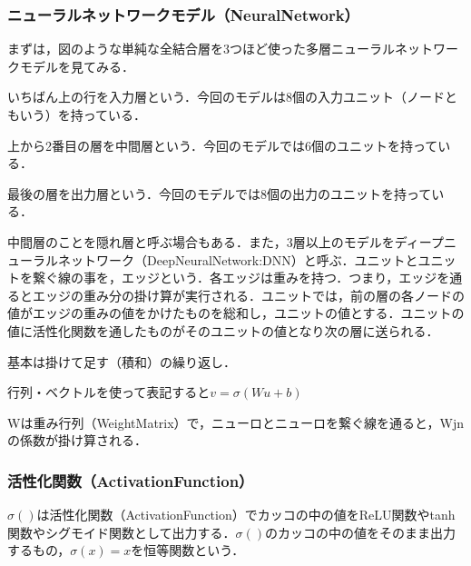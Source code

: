 \documentclass[uplatex,titlepage]{jsarticle}
\newif\iffigure
\begin{document}
\subsubsection{ニューラルネットワークモデル（NeuralNetwork）}
まずは，図のような単純な全結合層を3つほど使った多層ニューラルネットワークモデルを見てみる．\par
いちばん上の行を入力層という．今回のモデルは8個の入力ユニット（ノードともいう）を持っている．\par
上から2番目の層を中間層という．今回のモデルでは6個のユニットを持っている．\par
最後の層を出力層という．今回のモデルでは8個の出力のユニットを持っている．\par
中間層のことを隠れ層と呼ぶ場合もある．また，3層以上のモデルをディープニューラルネットワーク（DeepNeuralNetwork:DNN）と呼ぶ．ユニットとユニットを繋ぐ線の事を，エッジという．各エッジは重みを持つ．つまり，エッジを通るとエッジの重み分の掛け算が実行される．ユニットでは，前の層の各ノードの値がエッジの重みの値をかけたものを総和し，ユニットの値とする．ユニットの値に活性化関数を通したものがそのユニットの値となり次の層に送られる．
\iffigure
\begin{figure}[H]%
    \begin{center}
    \texttt{[image: deep\_learning\_model.png]} 
    \caption{多層ニューラルネットワークモデル}
    \end{center}
\end{figure}
\fi
基本は掛けて足す（積和）の繰り返し．\par
行列・ベクトルを使って表記すると$v=\sigma(Wu+b)$\par
Wは重み行列（WeightMatrix）で，ニューロとニューロを繋ぐ線を通ると，Wjnの係数が掛け算される．

\subsubsection{活性化関数（ActivationFunction）}
$\sigma()$は活性化関数（ActivationFunction）でカッコの中の値をReLU関数やtanh関数やシグモイド関数として出力する．$\sigma()$のカッコの中の値をそのまま出力するもの，$\sigma(x)=x$を恒等関数という．
\iffigure
\begin{figure}[H]%
    \begin{center}
    \texttt{[image: actication\_function.png]} 
    \caption{活性化関数}
    \end{center}
\end{figure}
\fi
\end{document}
